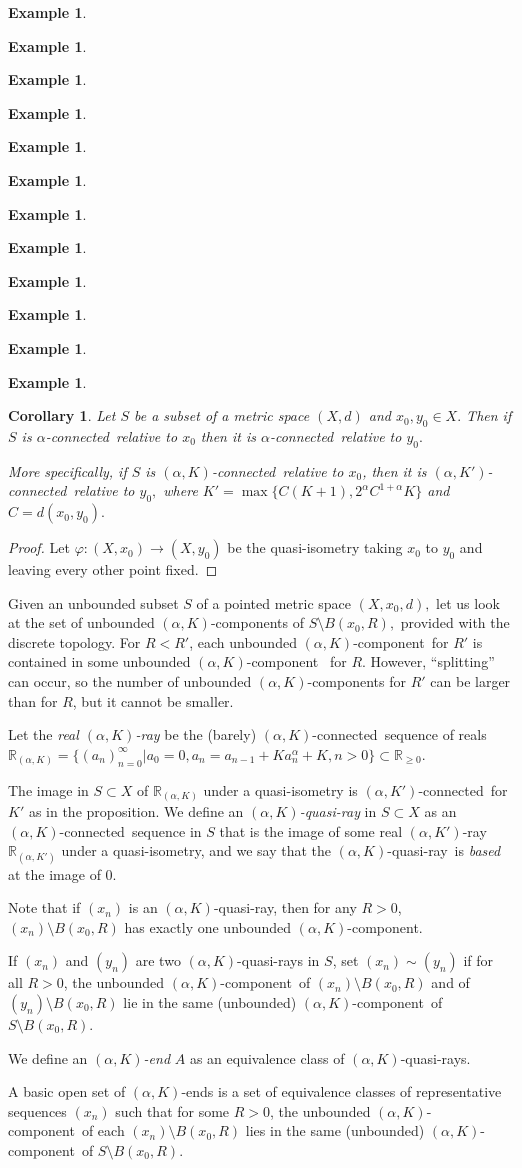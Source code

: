 \documentclass[12pt]{amsart}
\newtheorem{corollary}[theorem]{Corollary}
\theoremstyle{definition}
\newtheorem{example}[theorem]{Example}
\theoremstyle{remark}
\numberwithin{equation}{section}
\newcommand{\ph}{\varphi}
\newcommand{\R}{\mathbb{R}}
\newcommand{\Rak}{\mathbb{R}_{(\alpha, K)}}
\newcommand{\Rakp}{\mathbb{R}_{(\alpha, K')}}
\newcommand{\akcomp}{$(\alpha,K)$-component}
\newcommand{\akconn}{$(\alpha,K)$-connected}
\newcommand{\akpconn}{$(\alpha,K')$-connected}
\newcommand{\aconn}{$\alpha$-connected}
\newcommand{\akray}{$(\alpha,K)$-ray}
\newcommand{\akpray}{$(\alpha,K')$-ray}
\newcommand{\akqray}{$(\alpha,K)$-quasi-ray}
\newcommand{\akend}{$(\alpha,K)$-end}
\begin{document}
\begin{example}
\begin{example}
\begin{example}
\begin{example}
\begin{example}
\begin{example}
\begin{example}
\begin{example}
\begin{example}
\begin{example}
\begin{example}
\begin{example}
\begin{corollary}
Let $S$ be a subset of a metric space $(X,d)$ and $x_0,y_0 \in X.$
Then if $S$ is \aconn \ relative to $x_0$ then it is \aconn \ relative
to $y_0.$

More specifically, if $S$ is \akconn \ relative to $x_0$, then it is
\akpconn \ relative to $y_0,$ where $K'=\max\{C(K+1), 2^\alpha
C^{1+\alpha} K\}$ and $C = d(x_0,y_0).$
\end{corollary}

\begin{proof}
Let $\ph:(X,x_0) \to (X,y_0)$ be the quasi-isometry taking $x_0$ to
$y_0$ and leaving every other point fixed.
\end{proof}

Given an unbounded subset $S$ of a pointed metric space $(X,x_0,d),$
let us look at the set of unbounded \akcomp s of $S\setminus
B(x_0,R),$ provided with the discrete topology. For $R<R'$, each
unbounded \akcomp \ for $R'$ is contained in some unbounded \akcomp
\ for $R$. However, ``splitting'' can occur, so the number of
unbounded \akcomp s for $R'$ can be larger than for $R$, but it cannot
be smaller.

Let the {\em real \akray} be the (barely) \akconn \ sequence of reals
$\Rak = \{(a_n)_{n=0}^\infty | a_0=0, a_n = a_{n-1} + Ka_n^\alpha + K,
n>0 \} \subset \R_{\ge 0}.$

The image in $S \subset X$ of $\Rak$ under a quasi-isometry is
\akpconn \ for $K'$ as in the proposition. We define an {\em \akqray}
in $S \subset X$ as an \akconn \ sequence in $S$ that is the image of
some real \akpray \ $\Rakp$ under a quasi-isometry, and we say that
the \akqray \ is {\em based} at the image of 0.

Note that if $(x_n)$ is an \akqray, then for any $R >0$, $(x_n)
\setminus B(x_0,R)$ has exactly one unbounded \akcomp.

If $(x_n)$ and $(y_n)$ are two \akqray s in $S$, set $(x_n)\sim (y_n)$
if for all $R >0$, the unbounded \akcomp \ of $(x_n) \setminus
B(x_0,R)$ and of $(y_n) \setminus B(x_0,R)$ lie in the same
(unbounded) \akcomp \ of $S \setminus B(x_0,R)$.

We define an \emph{$(\alpha,K)$-end} $A$ as an equivalence class of
\akqray s.

A basic open set of \akend s is a set of equivalence classes of
representative sequences $(x_n)$ such that for some $R>0$, the
unbounded \akcomp \ of each $(x_n) \setminus B(x_0,R)$ lies in the
same (unbounded) \akcomp \ of $S \setminus B(x_0,R)$.


\end{example}
\end{example}
\end{example}
\end{example}
\end{example}
\end{example}
\end{example}
\end{example}
\end{example}
\end{example}
\end{example}
\end{example}
\end{document}
